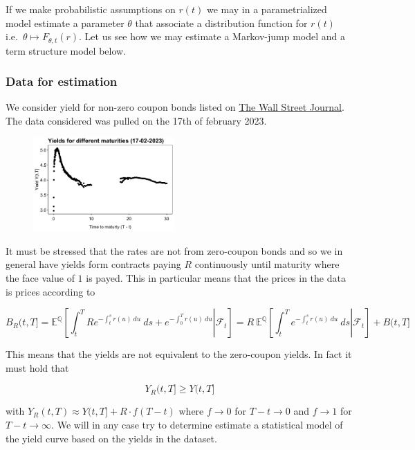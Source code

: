 \documentclass[
]{book}
\begin{document}
If we make probabilistic assumptions on \(r(t)\) we may in a parametrialized model estimate a parameter \(\theta\) that associate a distribution function for \(r(t)\) i.e.~\(\theta \mapsto F_{\theta,t}(r)\). Let us see how we may estimate a Markov-jump model and a term structure model below.

\hypertarget{data-for-estimation}{%
\subsubsection{Data for estimation}\label{data-for-estimation}}

We consider yield for non-zero coupon bonds listed on \href{https://www.wsj.com/market-data/bonds/treasuries?mod=md_bond_view_treasury_quotes}{The Wall Street Journal}. The data considered was pulled on the 17th of february 2023.

\begin{figure}[H]
  \begin{center}
    \includegraphics[width=0.48\textwidth]{figures/ph_est_data.png}
  \end{center}
\end{figure}

It must be stressed that the rates are not from zero-coupon bonds and so we in general have yields form contracts paying \(R\) continuously until maturity where the face value of \(1\) is payed. This in particular means that the prices in the data is prices according to

\[
B_R(t,T]=\mathbb E^{\mathbb Q}\left[\left.\int_t^T Re^{-\int_t^s r(u)\ du}\ ds+e^{-\int_0^T r(u)\ du} \right\vert\mathcal F_t\right]=R\ \mathbb  E^{\mathbb Q}\left[\left.\int_t^T e^{-\int_t^s r(u)\ du}\ ds \right\vert\mathcal F_t\right]+ B(t,T]
\]

This means that the yields are not equivalent to the zero-coupon yields. In fact it must hold that

\[
Y_R(t,T]\ge Y(t,T]
\]

with \(Y_R(t,T)\approx Y(t,T]+R\cdot f(T-t)\) where \(f\to 0\) for \(T-t\to 0\) and \(f\to 1\) for \(T-t\to \infty\). We will in any case try to determine estimate a statistical model of the yield curve based on the yields in the dataset.
\end{document}
